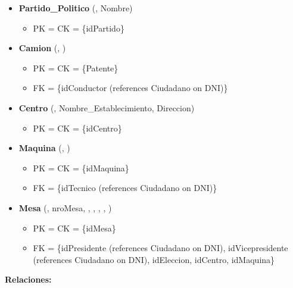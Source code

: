 \begin{itemize}
	\item \textbf{Partido\_Politico} (, Nombre) 
	\begin{itemize}
		\item PK = CK = \{idPartido\}
	\end{itemize}
	\vspace{1mm}

	\item \textbf{Camion} (, ) 
	\begin{itemize}
		\item PK = CK = \{Patente\}
		\item FK = \{idConductor (references Ciudadano on DNI)\}
	\end{itemize}
	\vspace{1mm}

	\item \textbf{Centro} (, Nombre\_Establecimiento, Direccion) 
	\begin{itemize}
		\item PK = CK = \{idCentro\}
	\end{itemize}
	\vspace{1mm}

	\item \textbf{Maquina} (, ) 
	\begin{itemize}
		\item PK = CK = \{idMaquina\}
		\item FK = \{idTecnico (references Ciudadano on DNI)\}
	\end{itemize}
	\vspace{1mm}
	\item \textbf{Mesa} (, nroMesa, , , , , ) 
	\begin{itemize}
		\item PK = CK = \{idMesa\}
		\item FK = \{idPresidente (references Ciudadano on DNI), idVicepresidente (references Ciudadano on DNI), idEleccion, idCentro, idMaquina\}
	\end{itemize}
	\vspace{1mm}

\end{itemize}
		
\vspace{2mm}
\textbf{Relaciones:}
\vspace{1mm}

